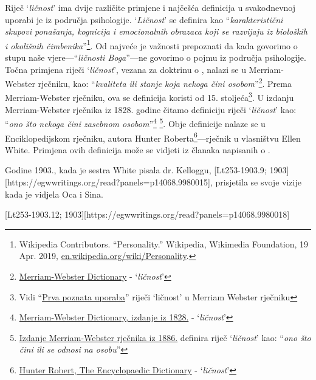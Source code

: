 Riječ ‘\textit{ličnost}’ ima dvije različite primjene i najčešća definicija u svakodnevnoj uporabi je iz područja psihologije. ‘\textit{Ličnost}’ se definira kao “\textit{karakteristični skupovi ponašanja, kognicija i emocionalnih obrazaca koji se razvijaju iz bioloških i okolišnih čimbenika}”\footnote{Wikipedia Contributors. “Personality.” Wikipedia, Wikimedia Foundation, 19 Apr. 2019, \href{https://en.wikipedia.org/wiki/Personality}{en.wikipedia.org/wiki/Personality}.}. Od najveće je važnosti prepoznati da kada govorimo o stupu naše vjere—“\textit{ličnosti Boga}”—ne govorimo o pojmu iz područja psihologije. Točna primjena riječi ‘\textit{ličnost}’, vezana za doktrinu o , nalazi se u Merriam-Webster rječniku, kao: “\textit{kvaliteta ili stanje koja nekoga čini osobom}”\footnote{\href{https://www.merriam-webster.com/dictionary/personality}{Merriam-Webster Dictionary} - ‘\textit{ličnost}’}. Prema Merriam-Webster rječniku, ova se definicija koristi od 15. stoljeća\footnote{Vidi “\href{https://www.merriam-webster.com/dictionary/personality\#word-history}{Prva poznata uporaba}” riječi ‘ličnost’ u Merriam Webster rječniku}. U izdanju Merriam-Webster rječnika iz 1828. godine čitamo definiciju riječi ‘\textit{ličnost}’ kao: “\textit{ono što nekoga čini zasebnom osobom}”\footnote{\href{https://archive.org/details/americandictiona02websrich/page/272/mode/2up}{Merriam-Webster Dictionary, izdanje iz 1828.} - ‘\textit{ličnost}’} \footnote{\href{https://archive.org/details/websterscomplete00webs/page/974/mode/2up}{Izdanje Merriam-Webster rječnika iz 1886.} definira riječ ‘\textit{ličnost}’ kao: “\textit{ono što čini ili se odnosi na osobu}”}. Obje definicije nalaze se u Enciklopedijskom rječniku, autora Hunter Roberta\footnote{\href{https://babel.hathitrust.org/cgi/pt?id=mdp.39015050663213&view=1up&seq=780}{Hunter Robert, The Encyclopaedic Dictionary} - ‘\textit{ličnost}’}—rječnik u vlasništvu Ellen White. Primjena ovih definicija može se vidjeti iz članaka napisanih o .

Godine 1903., kada je sestra White pisala dr. Kelloggu, [Lt253-1903.9; 1903][https://egwwritings.org/read?panels=p14068.9980015], prisjetila se svoje vizije kada je vidjela Oca i Sina.

[Lt253-1903.12; 1903][https://egwwritings.org/read?panels=p14068.9980018]

